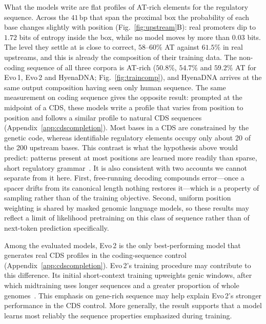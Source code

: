 \documentclass{article}
\newcommand{\rev}[1]{\begingroup\color{red}#1\endgroup}
\begin{document}
What the models write are flat profiles of AT-rich elements for the regulatory sequence. Across the $41$\,bp that span the
proximal box the probability of each base changes slightly with position
(Fig.~\ref{fig:upstream}B): real promoters dip to $1.72$ bits of entropy inside
the box, while no model moves by more than $0.03$ bits. The level they
settle at is close to correct, $58$--$60\%$ AT against $61.5\%$ in real upstreams,
and this is already the composition of their training data. The non-coding
sequence of all three corpora is AT-rich ($50.8\%$, $54.7\%$ and $59.2\%$ AT for
Evo\,1, Evo\,2 and HyenaDNA; Fig.~\ref{fig:traincomp}), and HyenaDNA arrives at
the same output composition having seen only human sequence. The same measurement on coding sequence gives the
opposite result: prompted at the midpoint of a CDS, these models write a profile
that varies from position to position and follows a similar profile to natural CDS sequences
(Appendix~\ref{app:cdscompletion}). Most bases in a CDS are constrained by the
genetic code, whereas identifiable regulatory elements occupy only about 20 of
the 200 upstream bases. \rev{This contrast is what the hypothesis above would predict: patterns present at
most positions are learned more readily than sparse, short regulatory
grammar}~\citep{simplicitybias2024,increasingcomplexity2024}. \rev{It is also
consistent with two accounts we cannot separate from it here. First, free-running
decoding compounds error---once a spacer drifts from its canonical length nothing
restores it---which is a property of sampling rather than of the training
objective. Second, uniform position weighting is shared by masked genomic
language models, so these results may reflect a limit of likelihood pretraining
on this class of sequence rather than of next-token prediction specifically.} 

Among the \rev{evaluated} models, Evo\,2 is the
only best-performing model that generates real CDS profiles in
the coding-sequence control (Appendix~\ref{app:cdscompletion}). Evo\,2's training procedure may contribute to this difference. Its initial
short-context training upweights genic windows, after which midtraining uses
longer sequences and a greater proportion of whole genomes~\citep{brixi2025evo2}.
This emphasis on gene-rich sequence may help explain Evo\,2's stronger performance
in the CDS control. More generally, the result supports that a model learns most
reliably the sequence properties emphasized during training.
\end{document}
